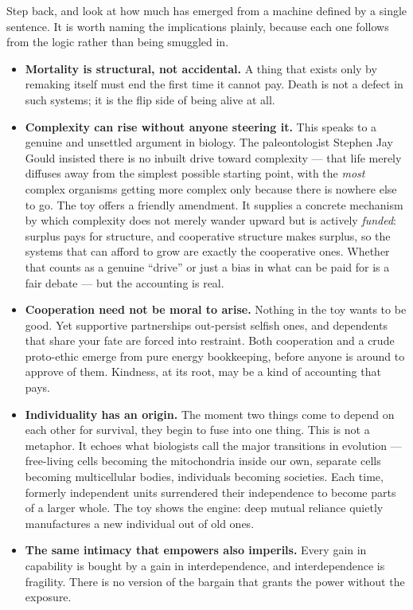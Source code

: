 \documentclass{article}
\begin{document}
Step back, and look at how much has emerged from a machine defined by a single sentence. It is worth naming the implications plainly, because each one follows from the logic rather than being smuggled in.

\begin{itemize}
    \item \textbf{Mortality is structural, not accidental.} A thing that exists only by remaking itself must end the first time it cannot pay. Death is not a defect in such systems; it is the flip side of being alive at all.
    \item \textbf{Complexity can rise without anyone steering it.} This speaks to a genuine and unsettled argument in biology. The paleontologist Stephen Jay Gould insisted there is no inbuilt drive toward complexity --- that life merely diffuses away from the simplest possible starting point, with the \emph{most} complex organisms getting more complex only because there is nowhere else to go. The toy offers a friendly amendment. It supplies a concrete mechanism by which complexity does not merely wander upward but is actively \emph{funded}: surplus pays for structure, and cooperative structure makes surplus, so the systems that can afford to grow are exactly the cooperative ones. Whether that counts as a genuine ``drive'' or just a bias in what can be paid for is a fair debate --- but the accounting is real.
    \item \textbf{Cooperation need not be moral to arise.} Nothing in the toy wants to be good. Yet supportive partnerships out-persist selfish ones, and dependents that share your fate are forced into restraint. Both cooperation and a crude proto-ethic emerge from pure energy bookkeeping, before anyone is around to approve of them. Kindness, at its root, may be a kind of accounting that pays.
    \item \textbf{Individuality has an origin.} The moment two things come to depend on each other for survival, they begin to fuse into one thing. This is not a metaphor. It echoes what biologists call the major transitions in evolution --- free-living cells becoming the mitochondria inside our own, separate cells becoming multicellular bodies, individuals becoming societies. Each time, formerly independent units surrendered their independence to become parts of a larger whole. The toy shows the engine: deep mutual reliance quietly manufactures a new individual out of old ones.
    \item \textbf{The same intimacy that empowers also imperils.} Every gain in capability is bought by a gain in interdependence, and interdependence is fragility. There is no version of the bargain that grants the power without the exposure.
\end{itemize}
\end{document}
